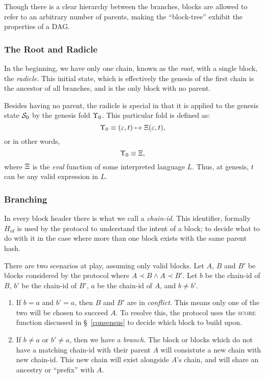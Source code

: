 Though there is a clear hierarchy between the branches, blocks are allowed to
refer to an arbitrary number of parents, making the ``block-tree'' exhibit the
properties of a DAG.

\subsubsection{The Root and Radicle}

In the beginning, we have only one chain, known as the \emph{root}, with a
single block, the \emph{radicle}. This initial state, which is effectively the
genesis of the first chain is the ancestor of all branches, and is the only
block with no parent.

Besides having no parent, the radicle is special in that it is applied to the
genesis state $\mathcal{S}_0$ by the genesis fold $\Upsilon_{0}$. This particular fold
is defined as:
\[
    \Upsilon_{0} \equiv (\varepsilon, t) \mapsto \operatorname{\Xi} (\varepsilon, t),
\]
or in other words,
\[
    \Upsilon_0 \equiv \operatorname{\Xi},
\]
where $\operatorname{\Xi}$ is the \emph{eval} function of some interpreted language $L$. Thus,
at genesis, $t$ can be any valid expression in $L$.

\subsubsection{Branching}

In every block header there is what we call a \emph{chain-id}. This identifier,
formally $H_{id}$ is used by the protocol to understand the intent of a block;
to decide what to do with it in the case where more than one block exists with
the same parent hash.

There are two scenarios at play, assuming only valid blocks.  Let $A$, $B$ and
$B'$ be blocks considered by the protocol where $A \prec B \wedge A \prec B'$.
Let $b$ be the chain-id of $B$,  $b'$ be the chain-id of $B'$,
$a$ be the chain-id of $A$, and $b \neq b'$.

\begin{enumerate}
    \item If $b = a$ and $b' = a$, then $B$ and $B'$ are in \emph{conflict}.
        This means only one of the two will be chosen to succeed $A$. To
        resolve this, the protocol uses the \textsc{score} function discussed
        in \S~\ref{consensus} to decide which block to build upon.
    \item If $b \neq a$ or $b' \neq a$, then we have a \emph{branch}. The block
        or blocks which do not have a matching chain-id with their parent $A$
        will consistute a new chain with new chain-id. This new chain will
        exist alongside $A$'s chain, and will share an ancestry or ``prefix''
        with $A$.
\end{enumerate}


